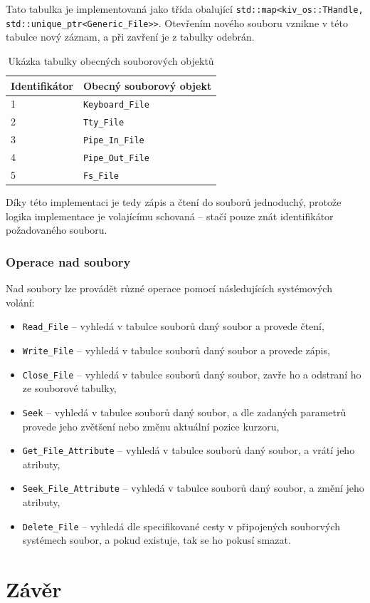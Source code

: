 \documentclass[12pt, a4paper]{article}
\let\oldsection\section
\renewcommand\section{\clearpage\oldsection}
\begin{document}
Tato tabulka je implementovaná jako třída obalující \texttt{std::map<kiv\_os::THandle, std::unique\_ptr<Generic\_File>>}. Otevřením nového souboru vznikne v této tabulce nový záznam, a při zavření je z tabulky odebrán.

\begin{table}[ht]
\centering
\begin{tabular}{|l|l|}
\hline
\textbf{Identifikátor} & \textbf{Obecný souborový objekt} \\ \hline
1                      & \texttt{Keyboard\_File}                   \\ \hline
2                      & \texttt{Tty\_File}                        \\ \hline
3                      & \texttt{Pipe\_In\_File}                   \\ \hline
4                      & \texttt{Pipe\_Out\_File}                  \\ \hline
5                      & \texttt{Fs\_File}                         \\ \hline
\end{tabular}
\caption{Ukázka tabulky obecných souborových objektů}
\end{table}

Díky této implementaci je tedy zápis a čtení do souborů jednoduchý, protože logika implementace je volajícímu schovaná -- stačí pouze znát identifikátor požadovaného souboru.

\subsubsection{Operace nad soubory}
Nad soubory lze provádět různé operace pomocí následujících systémových volání:

\begin{itemize}
    \item \texttt{Read\_File} -- vyhledá v tabulce souborů daný soubor a provede čtení,
    \item \texttt{Write\_File} -- vyhledá v tabulce souborů daný soubor a provede zápis,
    \item \texttt{Close\_File} -- vyhledá v tabulce souborů daný soubor, zavře ho a odstraní ho ze souborové tabulky,
    \item \texttt{Seek} -- vyhledá v tabulce souborů daný soubor, a dle zadaných parametrů provede jeho zvětšení nebo změnu aktuální pozice kurzoru,
    \item \texttt{Get\_File\_Attribute} -- vyhledá v tabulce souborů daný soubor, a vrátí jeho atributy,
    \item \texttt{Seek\_File\_Attribute} -- vyhledá v tabulce souborů daný soubor, a změní jeho atributy, 
    \item \texttt{Delete\_File} -- vyhledá dle specifikované cesty v připojených souborvých systémech soubor, a pokud existuje, tak se ho pokusí smazat.
\end{itemize}


\section{Závěr}	
\end{document}
